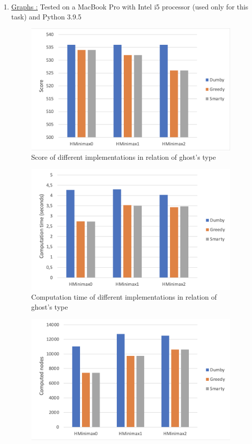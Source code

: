 \documentclass{article}
\begin{document}
\begin{enumerate}[label=\alph*.,leftmargin=*]
    \item \underline{Graphs :} Tested on a MacBook Pro with Intel i5 processor (used only for this task) and Python 3.9.5
    \begin{figure}[!h]
      \centering
      \includegraphics[scale = 0.45]{score.png}
      \caption{Score of different implementations in relation of ghost's type}  
    \end{figure}
    \begin{figure}[!h]
        \centering
        \includegraphics[scale = 0.45]{time.png}
        \caption{Computation time of different implementations in relation of ghost's type}  
    \end{figure}
    \begin{figure}[!h]
        \centering
        \includegraphics[scale = 0.45]{nodes.png}

\end{figure}
\end{enumerate}
\end{document}
